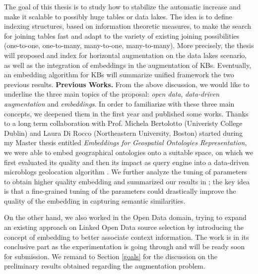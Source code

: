 The goal of this thesis is to study how to stabilize the automatic increase and make it scalable to possibly huge tables or data lakes. The idea is to define indexing structures, based on information theoretic measures, to make the search for joining tables fast and adapt to the variety of existing joining possibilities (one-to-one, one-to-many, many-to-one, many-to-many). More precisely, the thesis will proposed and index for horizontal augmentation on the data lakes scenario, as well as the integration of embeddings in the augmentation of KBs. Eventually, an embedding algorithm for KBs will summarize unified framework the two previous results.
\bigbreak
\textbf{Previous Works.} From the above discussion, we would like to underline the three main topics of the proposal: \textit{open data}, \textit{data-driven augmentation} and \textit{embeddings}. In order to familiarize with these three main concepts, we deepened them in the first year and published some works. Thanks to a long term collaboration with Prof. Michela Bertolotto (Univeristy College Dublin) and Laura Di Rocco (Northeastern University, Boston) started during my Master thesis entitled \textit{Embeddings for Geospatial Ontologies Representation}, we were able to embed geographical ontologies onto a suitable space, on which we first evaluated its quality \cite{dassereto2019evaluating} and then its impact as query engine into a data-driven microblogs geolocation algorithm \cite{di2020sherloc}. We further analyze the tuning of parameters to obtain higher quality embedding and summarized our results in \cite{dassereto2020tuning}; the key idea is that a fine-grained tuning of the parameters could drastically improve the quality of the embedding in capturing semantic similarities.

On the other hand, we also worked in the Open Data domain, trying to expand an existing approach on Linked Open Data source selection \cite{beyza2019linked} by introducing the concept of embedding to better associate context information. The work is in its conclusive part as the experimentation is going through and will be ready soon for submission. We remand to Section \ref{goals} for the discussion on the preliminary results obtained regarding the augmentation problem.



